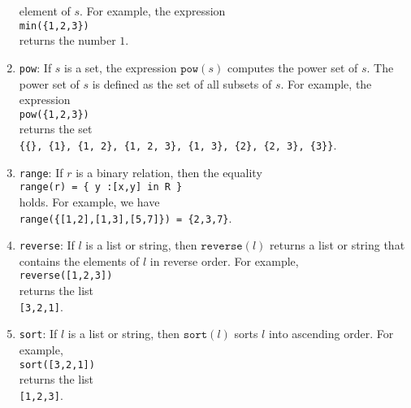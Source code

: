 \begin{enumerate}
      element of $s$.  For example, the expression
      \\[0.2cm]
      \hspace*{1.3cm}
      \texttt{min(\{1,2,3\})}
      \\[0.2cm]
      returns the number $1$.  
\item \texttt{pow}:  If $s$ is a set, the expression $\mathtt{pow}(s)$ computes the power
      set of $s$.  The power set of $s$ is defined as the set of all subsets of $s$.  
      For example, the expression
      \\[0.2cm]
      \hspace*{1.3cm}
      \texttt{pow(\{1,2,3\})}
      \\[0.2cm]
      returns the set
      \\[0.2cm]
      \hspace*{1.3cm}
      \texttt{\{\{\}, \{1\}, \{1, 2\}, \{1, 2, 3\}, \{1, 3\}, \{2\}, \{2, 3\}, \{3\}\}}.
\item \texttt{range}: If $r$ is a binary relation, then the equality
      \\[0.2cm]
      \hspace*{1.3cm}
      \texttt{range(r) = \{ y :[x,y] in R \}}
      \\[0.2cm]
      holds.  For example, we have
      \\[0.2cm]
      \hspace*{1.3cm}
      \texttt{range(\{[1,2],[1,3],[5,7]\}) = \{2,3,7\}}.
\item \texttt{reverse}: If $l$ is a list or string, then $\mathtt{reverse}(l)$ returns a 
      list or string that contains the elements of $l$ in reverse order.  For example,
      \\[0.2cm]
      \hspace*{1.3cm}
      \texttt{reverse([1,2,3])}
      \\[0.2cm]
      returns the list
      \\[0.2cm]
      \hspace*{1.3cm}
      \texttt{[3,2,1]}.
\item \texttt{sort}: If $l$ is a list or string, then $\mathtt{sort}(l)$ sorts $l$ into
      ascending order.  For example,
      \\[0.2cm]
      \hspace*{1.3cm}
      \texttt{sort([3,2,1])}
      \\[0.2cm]
      returns the list
      \\[0.2cm]
      \hspace*{1.3cm}
      \texttt{[1,2,3]}.
\end{enumerate}

